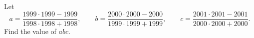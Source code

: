 Let
\[a=\dfrac{1999\cdot1999-1999}{1998\cdot1998+1998},\qquad b=\dfrac{2000\cdot2000-2000}{1999\cdot1999+1999},\qquad c=\dfrac{2001\cdot2001-2001}{2000\cdot2000+2000}.\]
Find the value of $abc$.
